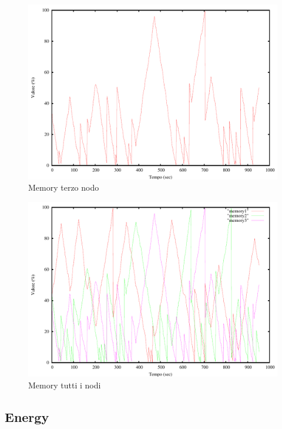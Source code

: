 \begin{figure}[H]
\begin{center}
\includegraphics[scale=0.6]{etc/memory3.pdf}
\caption{Memory terzo nodo}
\label{fig:memory3}
\end{center}
\end{figure}
\begin{figure}[H]
\begin{center}
\includegraphics[scale=0.6]{etc/memory.pdf}
\caption{Memory tutti i nodi}
\label{fig:memory}
\end{center}
\end{figure}

\subsection{Energy}

